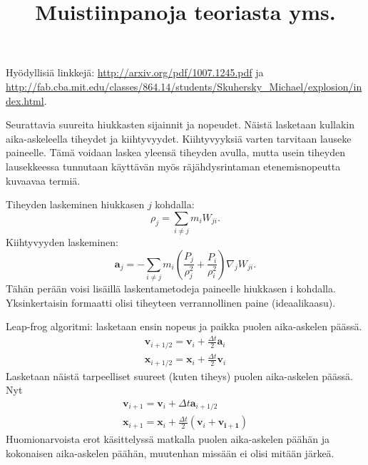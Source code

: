 \documentclass[a4paper,10pt]{article}
\begin{document}
\title{Muistiinpanoja teoriasta yms.}
\author{}
\date{}
\maketitle

Hyödyllisiä linkkejä: \url{http://arxiv.org/pdf/1007.1245.pdf} ja 
\url{http://fab.cba.mit.edu/classes/864.14/students/Skuhersky_Michael/explosion/index.html}.

Seurattavia suureita hiukkasten sijainnit ja nopeudet. Näistä lasketaan kullakin aika-askeleella
tiheydet ja kiihtyvyydet. Kiihtyvyyksiä varten tarvitaan lauseke paineelle. Tämä voidaan laskea
yleensä tiheyden avulla, mutta usein tiheyden lausekkeessa tunnutaan käyttävän myös räjähdysrintaman
etenemisnopeutta kuvaavaa termiä.

Tiheyden laskeminen hiukkasen $j$ kohdalla:
\begin{equation}
 \rho_j = \sum_{i \neq j} m_i W_{ji}.
\end{equation}
Kiihtyvyyden laskeminen:
\begin{equation}
 \mathbf{a}_j = - \sum_{i \neq j} m_i \left( \frac{P_j}{\rho_j^2} + \frac{P_i}{\rho_i^2} \right) \nabla_j W_{ji}.
\end{equation}
Tähän perään voisi lisäillä laskentametodeja paineelle hiukkasen i kohdalla. Yksinkertaisin formaatti olisi
tiheyteen verrannollinen paine (ideaalikaasu).

Leap-frog algoritmi: lasketaan ensin nopeus ja paikka puolen aika-askelen päässä.
\begin{eqnarray}
 \mathbf{v}_{i+1/2} = \mathbf{v}_i + \frac{\Delta t}{2} \mathbf{a}_i \\
 \mathbf{x}_{i+1/2} = \mathbf{x}_i + \frac{\Delta t}{2} \mathbf{v}_i
\end{eqnarray}
Lasketaan näistä tarpeelliset suureet (kuten tiheys) puolen aika-askelen päässä. Nyt
\begin{eqnarray}
 \mathbf{v}_{i+1} = \mathbf{v}_i + \Delta t \mathbf{a}_{i+1/2} \\
 \mathbf{x}_{i+1} = \mathbf{x}_i + \frac{\Delta t}{2} ( \mathbf{v}_i + \mathbf{v_{i+1}} )
\end{eqnarray}
Huomionarvoista erot käsittelyssä matkalla puolen aika-askelen päähän ja kokonaisen aika-askelen päähän,
muutenhan missään ei olisi mitään järkeä.
\end{document}
